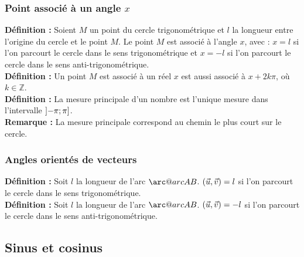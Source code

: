 \documentclass[a4paper,titlepage]{article}
\makeatletter
\let\oldleft\left
\renewcommand{\left}{\mathopen{}\mathclose\bgroup\oldleft}
\let\oldright\right
\renewcommand{\right}{\aftergroup\egroup\oldright}
\newcommand{\arc@char}{{\usefont{U}{tipa}{m}{n}\symbol{62}}}%
\newcommand{\arc}[1]{\mathpalette\arc@arc{#1}}
\newcommand{\arc@arc}[2]{
    \sbox0{$\m@th#1#2$}
    \vbox{
        \hbox{\resizebox{\wd0}{\height}{\arc@char}}
        \nointerlineskip
        \box0
    }
}
\makeatother
\begin{document}
        \subsubsection[Point associé à un angle $x$]{\boldmath Point associé à un angle $x$}
            \textbf{Définition :} Soient $M$ un point du cercle trigonométrique et $l$ la longueur entre l’origine du cercle et le point $M$. Le point $M$ est associé à l’angle $x$, avec : $x=l$ si l’on parcourt le cercle dans le sens trigonométrique et $x=-l$ si l’on parcourt le cercle dans le sens anti-trigonométrique.
            \\
            \textbf{Définition :} Un point $M$ est associé à un réel $x$ est aussi associé à $x+2k\pi$, où $k\in\mathbb{Z}$.
            \\
            \textbf{Définition :} La mesure principale d’un nombre est l’unique mesure dans l'intervalle $\left]-\pi;\pi\right]$.
            \\
            \textbf{Remarque :} La mesure principale correspond au chemin le plus court sur le cercle.
        \subsubsection{Angles orientés de vecteurs}
            \textbf{Définition :} Soit $l$ la longueur de l’arc $\arc{AB}$. $\left(\vec{u},\vec{v}\right)=l$ si l’on parcourt le cercle dans le sens trigonométrique.
            \\
            \textbf{Définition :} Soit $l$ la longueur de l’arc $\arc{AB}$. $\left(\vec{u},\vec{v}\right)=-l$ si l’on parcourt le cercle dans le sens anti-trigonométrique.
    \subsection{Sinus et cosinus}
\end{document}

